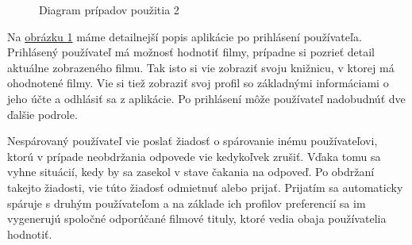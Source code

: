 \begin{figure}[hbt!]
  \centering  
  \def\stackalignment{c}
           {\scriptsize}
	\caption{Diagram prípadov použitia 2}
  \label{usecase2}
\end{figure}
Na \hyperref[usecase2]{obrázku \ref{usecase2}} máme detailnejší popis aplikácie po prihlásení používateľa. Prihlásený používateľ má možnosť hodnotiť filmy, prípadne si pozrieť detail aktuálne zobrazeného filmu. Tak isto si vie zobraziť svoju knižnicu, v ktorej má ohodnotené filmy. Vie si tiež zobraziť svoj profil so základnými informáciami o jeho účte a odhlásiť sa z aplikácie. Po prihlásení môže používateľ nadobudnúť dve ďalšie podrole. 

Nespárovaný používateľ vie poslať žiadosť o spárovanie inému používateľovi, ktorú v prípade neobdržania odpovede vie kedykoľvek zrušiť. Vďaka tomu sa vyhne situácií, kedy by sa zasekol v stave čakania na odpoveď. Po obdržaní takejto žiadosti, vie túto žiadosť odmietnuť alebo prijať. Prijatím sa automaticky spáruje s druhým používateľom a na základe ich profilov preferencií sa im vygenerujú spoločné odporúčané filmové tituly, ktoré vedia obaja používatelia hodnotiť. 

